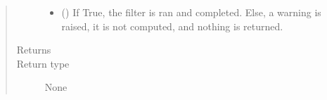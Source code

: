 \documentclass[letterpaper,10pt,english]{sphinxmanual}
\begin{document}
\begin{fulllineitems}
\begin{quote}
\begin{description}
\begin{itemize}
\item {} 
 (\sphinxstyleliteralemphasis{\sphinxupquote{ (}}\sphinxstyleliteralemphasis{\sphinxupquote{)}}) \textendash{} If True, the filter is ran and completed. Else, a warning is
raised, it is not computed, and nothing is returned.

\end{itemize}

\item[{Returns}] \leavevmode


\item[{Return type}] \leavevmode
None

\end{description}\end{quote}

\end{fulllineitems}

\end{document}
